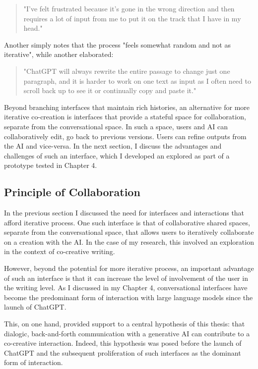 \begin{quote}
"I've felt frustrated because it's gone in the wrong direction and then requires a lot of input from me to put it on the track that I have in my head."
\end{quote}

Another simply notes that the process "feels somewhat random and not as iterative", while another elaborated:

\begin{quote}
"ChatGPT will always rewrite the entire passage to change just one paragraph, and it is harder to work on one text as input as I often need to scroll back up to see it or continually copy and paste it."
\end{quote}

Beyond branching interfaces that maintain rich histories, an alternative for more iterative co-creation is interfaces that provide a stateful space for collaboration, separate from the conversational space. In such a space, users and AI can collaboratively edit, go back to previous versions. Users can refine outputs from the AI and vice-versa. In the next section, I discuss the advantages and challenges of such an interface, which I developed an explored as part of a prototype tested in Chapter 4. 

\subsection{Principle of Collaboration}

In the previous section I discussed the need for interfaces and interactions that afford iterative process. One such interface is that of collaborative shared spaces, separate from the conversational space, that allows users to iteratively collaborate on a creation with the AI. In the case of my research, this involved an exploration in the context of co-creative writing. 

However, beyond the potential for more iterative process, an important advantage of such an interface is that it can increase the level of involvement of the user in the writing level. As I discussed in my Chapter 4, conversational interfaces have become the predominant form of interaction with large language models since the launch of ChatGPT. 

This, on one hand, provided support to a central hypothesis of this thesis: that dialogic, back-and-forth communication with a generative AI can contribute to a co-creative interaction. Indeed, this hypothesis was posed before the launch of ChatGPT and the subsequent proliferation of such interfaces as the dominant form of interaction. 

